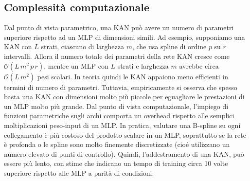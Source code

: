 \documentclass[a4paper,12pt]{report}
\begin{document}
	\subsection{Complessità computazionale}
	Dal punto di vista parametrico, una KAN può avere un numero di parametri superiore rispetto ad un MLP di dimensioni simili. Ad esempio, supponiamo una KAN con $L$ strati, ciascuno di larghezza $m$, che usa spline di ordine $p$ su $r$ intervalli. Allora il numero totale dei parametri della rete KAN cresce come $\mathcal{O}(L\,m^2\,p\,r)$, mentre un MLP con $L$ strati e larghezza $m$ avrebbe circa $\mathcal{O}(L\,m^2)$ pesi scalari. In teoria quindi le KAN appaiono meno efficienti in termini di numero di parametri. Tuttavia, empiricamente si osserva che spesso basta una KAN con dimensioni molto più piccole per eguagliare le prestazioni di un MLP molto più grande. Dal punto di vista computazionale, l’impiego di funzioni parametriche sugli archi comporta un overhead rispetto alle semplici moltiplicazioni peso-input di un MLP. In pratica, valutare una B-spline su ogni collegamento è più costoso del prodotto scalare in un MLP, soprattutto se la rete è profonda o le spline sono molto finemente discretizzate (cioé utilizzano un numero elevato di punti di controllo). Quindi, l'addestramento di una KAN, può essere più lento, con stime che indicano un tempo di training circa 10 volte superiore rispetto alle MLP a parità di condizioni.
	
\end{document}
